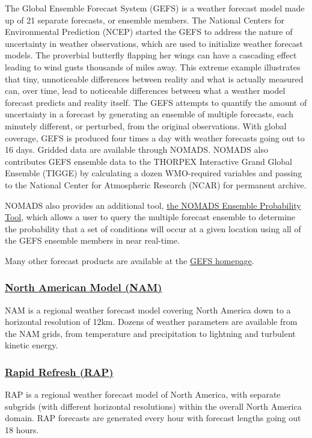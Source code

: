 \documentclass[11pt]{article}
\begin{document}
The Global Ensemble Forecast System (GEFS) is a weather forecast
model made up of 21 separate forecasts, or ensemble members. The
National Centers for Environmental Prediction (NCEP) started the
GEFS to address the nature of uncertainty in weather observations,
which are used to initialize weather forecast models. The
proverbial butterfly flapping her wings can have a cascading
effect leading to wind gusts thousands of miles away. This extreme
example illustrates that tiny, unnoticeable differences between
reality and what is actually measured can, over time, lead to
noticeable differences between what a weather model forecast
predicts and reality itself. The GEFS attempts to quantify the
amount of uncertainty in a forecast by generating an ensemble of
multiple forecasts, each minutely different, or perturbed, from
the original observations. With global coverage, GEFS is produced
four times a day with weather forecasts going out to 16
days. Gridded data are available through NOMADS. NOMADS also
contributes GEFS ensemble data to the THORPEX Interactive Grand
Global Ensemble (TIGGE) by calculating a dozen WMO-required
variables and passing to the National Center for Atmospheric
Research (NCAR) for permanent archive. 

NOMADS also provides an additional tool, \href{http://nomads.ncdc.noaa.gov/EnsProb/}{the NOMADS Ensemble
Probability Tool}, which allows a user to query the multiple forecast
ensemble to determine the probability that a set of conditions will
occur at a given location using all of the GEFS ensemble members in
near real-time.

Many other forecast products are available at the \href{http://www.emc.ncep.noaa.gov/GEFS/.php}{GEFS homepage}.
\subsubsection{\href{http://www.ncdc.noaa.gov/data-access/model-data/model-datasets/north-american-mesoscale-forecast-system-nam}{North American Model (NAM)}}
\label{sec-2-1-4}
NAM is a regional weather forecast model covering North America down
to a horizontal resolution of 12km. Dozens of weather parameters are
available from the NAM grids, from temperature and precipitation to
lightning and turbulent kinetic energy.

\subsubsection{\href{http://www.ncdc.noaa.gov/data-access/model-data/model-datasets/rapid-refresh-rap}{Rapid Refresh (RAP)}}
\label{sec-2-1-5}
RAP is a regional weather forecast model of North America, with
separate subgrids (with different horizontal resolutions) within the
overall North America domain. RAP forecasts are generated every hour
with forecast lengths going out 18 hours.
\end{document}
